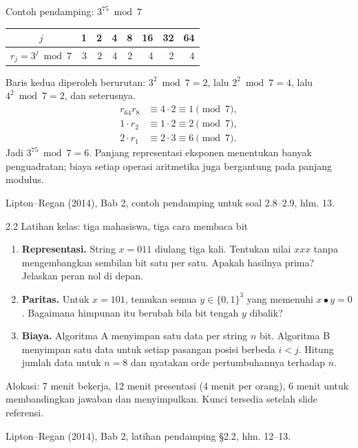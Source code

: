 \documentclass[aspectratio=169,11pt]{beamer}
\newcommand{\bookref}[1]{\par\vfill{\scriptsize\color{gray}Lipton--Regan (2014), Bab 2, #1.}}
\begin{document}
\begin{frame}{Contoh pendamping: $3^{75}\bmod 7$}
\begin{center}\begin{tabular}{c|rrrrrrr}
$j$&1&2&4&8&16&32&64\\\hline
$r_j=3^j\bmod7$&3&2&4&2&4&2&4
\end{tabular}\end{center}
Baris kedua diperoleh berurutan: $3^2\bmod7=2$, lalu $2^2\bmod7=4$, lalu $4^2\bmod7=2$, dan seterusnya.
\begin{align*}
r_{64}r_8 &\equiv 4\cdot2\equiv1\pmod7,\\
1\cdot r_2 &\equiv 1\cdot2\equiv2\pmod7,\\
2\cdot r_1 &\equiv 2\cdot3\equiv6\pmod7.
\end{align*}
Jadi $3^{75}\bmod7=6$. Panjang representasi eksponen menentukan banyak penguadratan; biaya setiap operasi aritmetika juga bergantung pada panjang modulus.
\bookref{contoh pendamping untuk soal 2.8--2.9, hlm. 13}
\end{frame}

\begin{frame}{2.2 Latihan kelas: tiga mahasiswa, tiga cara membaca bit}
\begin{enumerate}
\item \textbf{Representasi.} String $x=011$ diulang tiga kali. Tentukan nilai $xxx$ tanpa mengembangkan sembilan bit satu per satu. Apakah hasilnya prima? Jelaskan peran nol di depan.
\item \textbf{Paritas.} Untuk $x=101$, temukan semua $y\in\{0,1\}^3$ yang memenuhi $x\bullet y=0$. Bagaimana himpunan itu berubah bila bit tengah $y$ dibalik?
\item \textbf{Biaya.} Algoritma A menyimpan satu data per string $n$ bit. Algoritma B menyimpan satu data untuk setiap pasangan posisi berbeda $i<j$. Hitung jumlah data untuk $n=8$ dan nyatakan orde pertumbuhannya terhadap $n$.
\end{enumerate}
\par\medskip Alokasi: 7 menit bekerja, 12 menit presentasi (4 menit per orang), 6 menit untuk membandingkan jawaban dan menyimpulkan. Kunci tersedia setelah slide referensi.
\bookref{latihan pendamping \S2.2, hlm. 12--13}
\end{frame}
\end{document}
